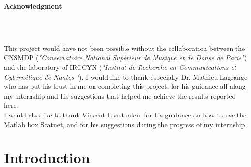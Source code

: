 \documentclass[hidelinks,12pt]{report}
\begin{document}
\begin{center}
\begin{large}
\textbf{Acknowledgment} 
\end{large}\\~\\
\end{center}
\par This project would have not been possible without the collaboration between the CNSMDP  (\textit{"Conservatoire National Supérieur de Musique et de Danse de Paris"}) and the laboratory of IRCCYN (\textit{"Institut de Recherche en Communications et Cybernétique de Nantes
"}). I would like to thank especially Dr. Mathieu Lagrange who has put his trust in me on completing this project, for his guidance all along my internship and his suggestions that helped me achieve the results reported here.\\ I would also like to thank Vincent Lonstanlen, for his guidance on how to use the Matlab box Scatnet, and for his suggestions during the progress of my internship.
\thispagestyle{empty}
\newpage
\tableofcontents
\thispagestyle{empty}
\newpage
\clearpage
\thispagestyle{empty}
\newpage
\listoffigures
\thispagestyle{empty}
\newpage
\clearpage
\setcounter{page}{1}
\noindent




\chapter{Introduction}
\end{document}
